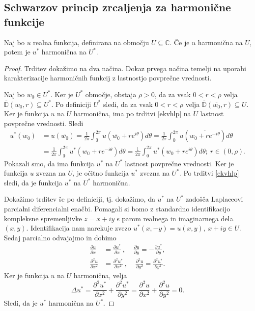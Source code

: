 \documentclass[mat1, tisk]{fmfdelo}
\begin{document}
\subsection{Schwarzov princip zrcaljenja za harmonične funkcije}
    \begin{trditev}
        \label{lemaharm}
        Naj bo $u$ realna funkcija, definirana na območju $U \subseteq \mathbb{C}$. Če je $u$ harmonična na $U$, potem je $u^*$ harmonična na $U^*$. 
    \end{trditev}
    \begin{proof}
        Trditev dokažimo na dva načina. Dokaz prvega načina temelji na uporabi karakterizacije harmoničnih funkcij z lastnostjo povprečne vrednosti. 
        
        Naj bo \mbox{$w_0 \in U^*$}. Ker je $U^*$ območje, obstaja $\rho>0$, da za vsak $0 < r < \rho$ velja $\overline{\mathbb{D}}(w_0, r) \subseteq U^*$. Po definiciji $U^*$ sledi, da za vsak \mbox{$0 < r < \rho$} velja $\overline{\mathbb{D}}(\overline{w_0}, r) \subseteq U$. 
        Ker je funkcija $u$ na $U$ harmonična, ima po trditvi \ref{ekvhlp} na $U$ lastnost povprečne vrednosti. Sledi
        \begin{align*}
            u^*(w_0) & = u(\overline{w_0}) = \frac{1}{2 \pi} \int_{0}^{2 \pi}{u\left(\overline{w_0} + r e^{i \theta}\right) d\theta} = \frac{1}{2 \pi} \int_{0}^{2 \pi}{u\left(\overline{w_0 + r e^{-i \theta}}\right) d\theta}\\
            &= \frac{1}{2 \pi} \int_{0}^{2 \pi}{u^*\left(w_0 + r e^{-i \theta}\right) d\theta} = \frac{1}{2 \pi} \int_{0}^{2 \pi}{u^*\left(w_0 + r e^{i \theta}\right) d\theta};~r \in (0, \rho).
        \end{align*} 
        Pokazali smo, da ima funkcija $u^*$ na $U^*$ lastnost povprečne vrednosti. 
        Ker je funkcija $u$ zvezna na $U$, je očitno funkcija $u^*$ zvezna na $U^*$. 
        Po trditvi \ref{ekvhlp} sledi, da je funkcija $u^*$ na $U^*$ harmonična. 
        
        Dokažimo trditev še po definiciji, tj. dokažimo, da $u^*$ na $U^*$ zadošča Laplaceovi parcialni diferencialni enačbi.
        Pomagali si bomo z standardno identifikacijo kompleksne spremenljivke $z = x + iy$ s parom realnega in imaginarnega dela $(x,y)$.
        Identifikacija nam narekuje zvezo $u^*(x,-y) = u(x, y),~ x + iy \in U$.
        Sedaj parcialno odvajajmo in dobimo
        \begin{align*}
            \frac{\partial u}{\partial x} &= \frac{\partial u^* }{\partial x}~,~~~~~\frac{\partial u}{\partial y} = - \frac{\partial u^* }{\partial y}, \\
            \frac{\partial^2 u}{\partial x^2} & = \frac{\partial^2 u^* }{\partial x^2}~,~~~~~\frac{\partial^2 u}{\partial y^2} = \frac{\partial^2 u^* }{\partial y^2}.
        \end{align*}
        Ker je funkcija $u$ na $U$ harmonična, velja
        $$
            \Delta u^* = \frac{\partial^2 u^*}{\partial x^2} + \frac{\partial^2 u^*}{\partial y^2} = \frac{\partial^2 u}{\partial x^2} + \frac{\partial^2 u}{\partial y^2} = 0.
        $$
        Sledi, da je $u^*$ harmonična na $U^*$.
    \end{proof}
\end{document}
